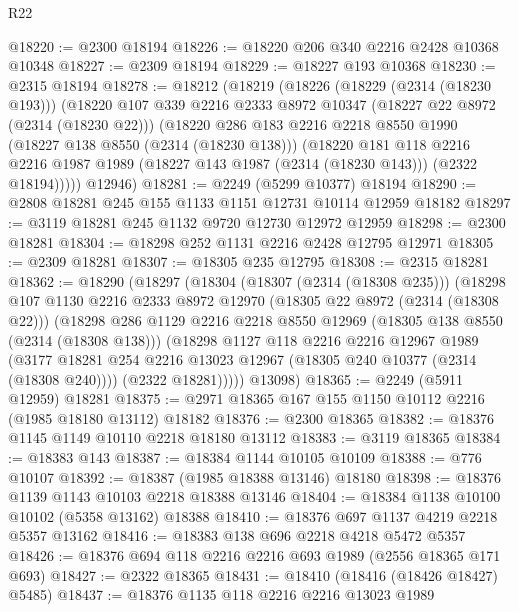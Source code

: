 \begin{lexlean}{R22}
\begin{coremodule}
@18220 := @2300 @18194
@18226 := @18220 @206 @340 @2216 @2428 @10368 @10348
@18227 := @2309 @18194
@18229 := @18227 @193 @10368
@18230 := @2315 @18194
@18278 := @18212
    (@18219
      (@18226
        (@18229 (@2314 (@18230 @193)))
        (@18220
          @107
          @339
          @2216
          @2333
          @8972
          @10347
          (@18227 @22 @8972 (@2314 (@18230 @22)))
          (@18220
            @286
            @183
            @2216
            @2218
            @8550
            @1990
            (@18227 @138 @8550 (@2314 (@18230 @138)))
            (@18220
              @181
              @118
              @2216
              @2216
              @1987
              @1989
              (@18227 @143 @1987 (@2314 (@18230 @143)))
              (@2322 @18194)))))
      @12946)
@18281 := @2249 (@5299 @10377) @18194
@18290 := @2808 @18281 @245 @155 @1133 @1151 @12731 @10114 @12959 @18182
@18297 := @3119 @18281 @245 @1132 @9720 @12730 @12972 @12959
@18298 := @2300 @18281
@18304 := @18298 @252 @1131 @2216 @2428 @12795 @12971
@18305 := @2309 @18281
@18307 := @18305 @235 @12795
@18308 := @2315 @18281
@18362 := @18290
    (@18297
      (@18304
        (@18307 (@2314 (@18308 @235)))
        (@18298
          @107
          @1130
          @2216
          @2333
          @8972
          @12970
          (@18305 @22 @8972 (@2314 (@18308 @22)))
          (@18298
            @286
            @1129
            @2216
            @2218
            @8550
            @12969
            (@18305 @138 @8550 (@2314 (@18308 @138)))
            (@18298
              @1127
              @118
              @2216
              @2216
              @12967
              @1989
              (@3177 @18281 @254 @2216 @13023 @12967 (@18305 @240 @10377 (@2314 (@18308 @240))))
              (@2322 @18281)))))
      @13098)
@18365 := @2249 (@5911 @12959) @18281
@18375 := @2971 @18365 @167 @155 @1150 @10112 @2216 (@1985 @18180 @13112) @18182
@18376 := @2300 @18365
@18382 := @18376 @1145 @1149 @10110 @2218 @18180 @13112
@18383 := @3119 @18365
@18384 := @18383 @143
@18387 := @18384 @1144 @10105 @10109
@18388 := @776 @10107
@18392 := @18387 (@1985 @18388 @13146) @18180
@18398 := @18376 @1139 @1143 @10103 @2218 @18388 @13146
@18404 := @18384 @1138 @10100 @10102 (@5358 @13162) @18388
@18410 := @18376 @697 @1137 @4219 @2218 @5357 @13162
@18416 := @18383 @138 @696 @2218 @4218 @5472 @5357
@18426 := @18376 @694 @118 @2216 @2216 @693 @1989 (@2556 @18365 @171 @693)
@18427 := @2322 @18365
@18431 := @18410 (@18416 (@18426 @18427) @5485)
@18437 := @18376 @1135 @118 @2216 @2216 @13023 @1989

\end{coremodule}
\end{lexlean}

